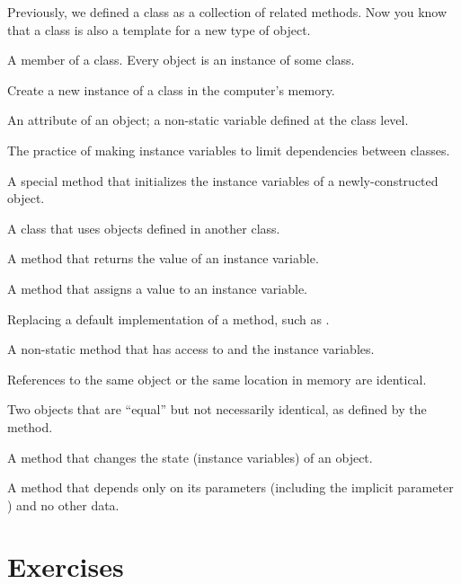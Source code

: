 \begin{description}

Previously, we defined a class as a collection of related methods.
Now you know that a class is also a template for a new type of object.

A member of a class.
Every object is an instance of some class.

Create a new instance of a class in the computer's memory.


An attribute of an object; a non-static variable defined at the class level.

The practice of making instance variables  to limit dependencies between classes.

A special method that initializes the instance variables of a newly-constructed object.


A class that uses objects defined in another class.

A method that returns the value of an instance variable.

A method that assigns a value to an instance variable.

Replacing a default implementation of a method, such as .

A non-static method that has access to  and the instance variables.

References to the same object or the same location in memory are identical.

Two objects that are ``equal'' but not necessarily identical, as defined by the  method.

A method that changes the state (instance variables) of an object.

A method that depends only on its parameters (including the implicit parameter ) and no other data.

\end{description}


\section{Exercises}

